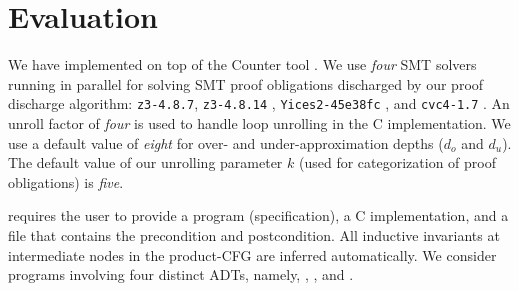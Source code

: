 % 

\vspace{-10px}
\section{Evaluation}
\label{sec:syn-eval}
\vspace{-5px}
We have implemented \toolName{} on top of the
Counter tool \cite{oopsla20}.
We use {\em four} SMT solvers running in parallel for solving
SMT proof obligations discharged by our proof discharge algorithm:
{\tt z3-4.8.7}, {\tt z3-4.8.14} \cite{z3},
{\tt Yices2-45e38fc} \cite{yices},
and {\tt cvc4-1.7} \cite{cvc4solver}.
An unroll factor of {\em four} is used to handle loop unrolling in the C implementation.
We use a default value of {\em eight} for
over- and under-approximation depths ($d_o$ and $d_u$).
The default value of
our unrolling parameter $k$ (used for categorization of proof obligations) is {\em five}.

\toolName{} requires the user to provide a \SpecL{} program (specification), a C implementation,
and a file that contains the precondition and postcondition. All inductive invariants
at intermediate nodes in the product-CFG are inferred automatically.
We consider programs involving four distinct ADTs, namely,
 ,  ,  
and  .


